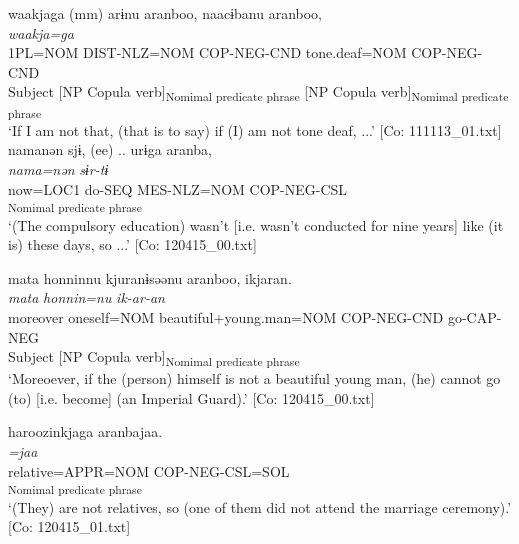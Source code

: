 \ex %
     \gllll waakjaga  (mm)  arɨnu  aranboo, naacɨbanu  aranboo,\\
      \textit{waakja=ga}    \textit{}  \textit{}  \textit{}  \textit{}\\                                                                  
      1PL=NOM                  DIST-NLZ=NOM  COP-NEG-CND              tone.deaf=NOM  COP-NEG-CND\\
      Subject    [NP  Copula verb]\textsubscript{Nomimal predicate phrase} [NP  Copula verb]\textsubscript{Nomimal predicate phrase}\\
      \glt  ‘If I am not that, (that is to say) if (I) am not tone deaf, ...’   [Co: 111113\_01.txt]
\ex \label{ex:.c} %
    \gllll  namanən  sjɨ,  (ee)  ..  urɨga  aranba,\\
      \textit{nama=nən}  \textit{sɨr-tɨ}      \textit{}  \textit{}\\
      now=LOC1  do-SEQ      MES-NLZ=NOM  COP-NEG-CSL\\
              [NP  Copula verb]\textsubscript{Nomimal predicate phrase}\\
      \glt       ‘(The compulsory education) wasn’t [i.e. wasn’t conducted for nine years] like (it is) these days, so ...’ [Co: 120415\_00.txt]

\ex  %
     \glll mata  {\textbar}honnin{\textbar}nu  kjuranɨsəənu   aranboo,  ikjaran.\\
      \textit{mata}  \textit{honnin=nu}  \textit{}  \textit{}  \textit{ik-ar-an}\\                                                                 
      moreover  oneself=NOM  beautiful+young.man=NOM              COP-NEG-CND  go-CAP-NEG\\                                                                 
        Subject  [NP                                              Copula verb]\textsubscript{Nomimal predicate phrase}\\
    \glt ‘Moreoever, if the (person) himself is not a beautiful young man, (he) cannot go (to) [i.e. become] (an Imperial Guard).’   [Co: 120415\_00.txt]

\ex %
\gllll   haroozinkjaga  aranbajaa.\\
      \textit{}  \textit{=jaa}\\
      relative=APPR=NOM  COP-NEG-CSL=SOL\\
      [NP  Copula verb]\textsubscript{Nomimal predicate phrase}\\
      \glt       ‘(They) are not relatives, so (one of them did not attend the marriage ceremony).’ [Co: 120415\_01.txt]
    \z
\z

